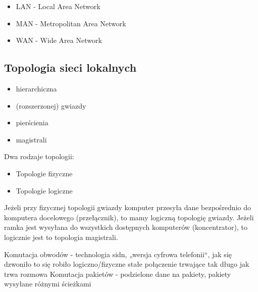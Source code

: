\documentclass[../main.tex]{subfiles}
\begin{document}
    \begin{itemize}
        \item LAN - Local Area Network
        \item MAN - Metropolitan Area Network
        \item WAN - Wide Area Network
    \end{itemize}


    \subsection{Topologia sieci lokalnych}
    \begin{itemize}
        \item hierarchiczna
        \item (rozszerzonej) gwiazdy
        \item pierścienia
        \item magistrali
    \end{itemize}


    Dwa rodzaje topologii:
    \begin{itemize}
        \item Topologie fizyczne
        \item Topologie logiczne
    \end{itemize}

    Jeżeli przy fizycznej topologii gwiazdy komputer przesyła dane bezpośrednio do komputera docelowego (przełącznik), to mamy logiczną topologię gwiazdy. Jeżeli ramka jest wysyłana do wszystkich dostępnych komputerów (koncentrator), to logicznie jest to topologia magistrali.


    Komutacja obwodów - technologia sidn, „wersja cyfrowa telefonii“, jak się dzwoniło to się robiło logiczno/fizyczne stałe połączenie trwające tak długo jak trwa rozmowa
    Komutacja  pakietów - podzielone dane na pakiety, pakiety wysyłane różnymi ścieżkami
\end{document}
